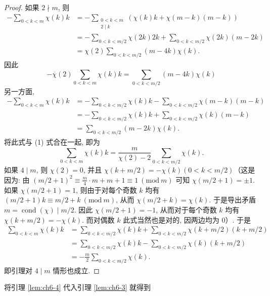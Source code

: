 \begin{proof}
如果 $2\nmid m$, 则
\begin{align*}
  -\sum_{0<k<m}\chi(k)k&=-\sum_{\substack{0<k<m\\ 2\mid k}}\left(\chi(k)k+\chi(m-k)(m-k)\right)\\
  &=-\sum_{0<k<m/2}\chi(2k)2k+\sum_{0<k<m/2}\chi(2k)(m-2k)\\
  &=\chi(2)\sum_{0<k<m/2}(m-4k)\chi(k).
\end{align*}
因此
\begin{equation}\tag{1}
  -\overline{\chi}(2)\sum_{0<k<m}\chi(k)k=\sum_{0<k<m/2}(m-4k)\chi(k)
\end{equation}
另一方面,
\begin{align*}
  -\sum_{0<k<m}\chi(k)k&=-\sum_{0<k<m/2}\chi(k)k-\sum_{0<k<m/2}\chi(m-k)(m-k)\\
  &=-\sum_{0<k<m/2}\chi(k)k+\sum_{0<k<m/2}\chi(k)(m-k)\\
  &=\sum_{0<k<m/2}(m-2k)\chi(k).
\end{align*}
将此式与 (1) 式合在一起, 即为
\[
  \sum_{0<k<m}\chi(k)k=\frac{m}{\chi(2)-2}\sum_{0<k<m/2}\chi(k).
\]
如果 $4\mid m$, 则 $\chi(2)=0$, 并且 $\chi(k+m/2)=-\chi(k)(0<k<m/2)$（这是因为: 由 $(m/2+1)^2\equiv\frac{m}{4}\cdot m+m+1\equiv 1\ (\mathrm{mod}\ m)$ 可知 $\chi(m/2+1)=\pm 1$. 如果 $\chi(m/2+1)=1$, 则由于对每个奇数 $k$ 均有 $(m/2+1)k\equiv m/2+k\ (\mathrm{mod}\ m)$, 从而 $\chi(m/2+k)=\chi(k)$. 于是导出矛盾 $m=\operatorname{cond}(\chi)\mid m/2$. 因此 $\chi(m/2+1)=-1$, 从而对于每个奇数 $k$ 均有 $\chi(k+m/2)=-\chi(k)$. 而对偶数 $k$ 此式当然也是对的, 因两边均为 $0$）. 于是
\begin{align*}
  \sum_{0<k<m}\chi(k)k&=\sum_{0<k<m/2}\chi(k)k+\sum_{0<k<m/2}\chi(k+m/2)(k+m/2)\\
  &=\sum_{0<k<m/2}\chi(k)k-\sum_{0<k<m/2}\chi(k)(k+m/2)\\
  &=-\frac{m}{2}\sum_{0<k<m/2}\chi(k).
\end{align*}
即引理对 $4\mid m$ 情形也成立.
\end{proof}

将引理 \ref{lem:ch6-4} 代入引理 \ref{lem:ch6-3} 就得到

